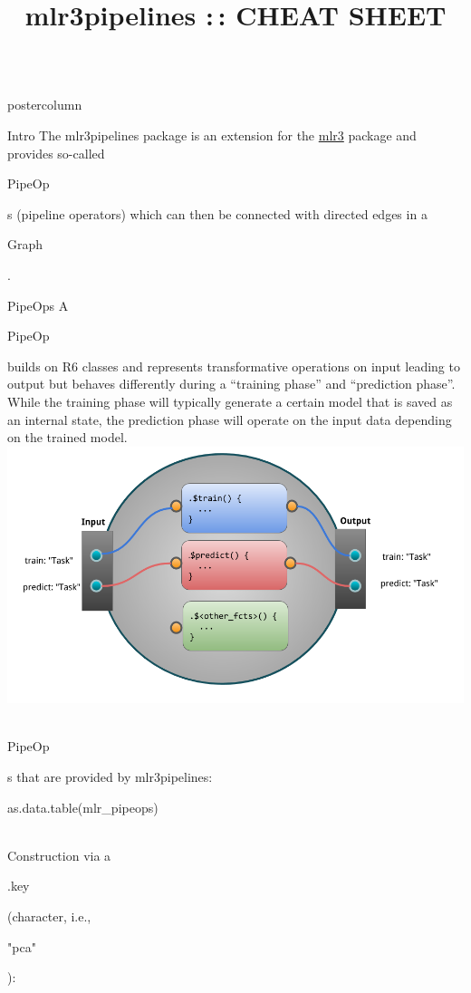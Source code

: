 \documentclass{beamer}
\title{mlr3pipelines :\,: CHEAT SHEET} %
\newlength{\columnheight} %
\newcommand{\codeinline}[1]{\begin{codeboxinline}#1\end{codeboxinline}}
\begin{document}
\begin{frame}[fragile]{}
	\begin{columns}
		\begin{column}{.245\textwidth}
			\begin{beamercolorbox}[center]{postercolumn}
				\begin{minipage}{.98\textwidth}
					\parbox[t][\columnheight]{\textwidth}{
						\begin{myblock}{Intro}
              The mlr3pipelines package is an extension for the \href{https://github.com/mlr-org/mlr3}{mlr3} package and provides so-called \codeinline{PipeOp}s (pipeline operators) which can then be connected with directed edges in a \codeinline{Graph}.
            \end{myblock}
						\begin{myblock}{PipeOps}
              A \codeinline{PipeOp} builds on R6 classes and represents transformative operations on input leading to output but behaves differently during a ``training phase'' and ``prediction phase''. While the training phase will typically generate a certain model that is saved as an internal state, the prediction phase will operate on the input data depending on the trained model.
              \ \\
              \includegraphics[width=\textwidth]{img/po_viz.png}
              \ \\
              \codeinline{PipeOp}s that are provided by mlr3pipelines:
              \begin{codebox}
                as.data.table(mlr\_pipeops)
              \end{codebox}
              \ \\
              Construction via a \codeinline{.key} (character, i.e., \codeinline{"pca"}):
              \begin{codebox}

\end{codebox}
\end{myblock}}
\end{minipage}
\end{beamercolorbox}
\end{column}
\end{columns}
\end{frame}
\end{document}

